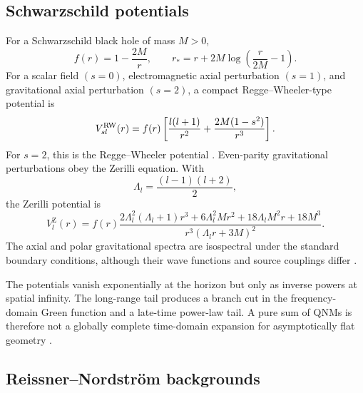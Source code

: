 \subsection{Schwarzschild potentials}
\label{subsec:schwarzschild-potentials}

For a Schwarzschild black hole of mass $M>0$,
\begin{equation}
  f(r)=1-\frac{2M}{r},
  \qquad
  r_*=r+2M\log\left(\frac{r}{2M}-1\right) .
  \label{eq:schwarzschild-tortoise}
\end{equation}
For a scalar field $(s=0)$, electromagnetic axial perturbation $(s=1)$, and
gravitational axial perturbation $(s=2)$, a compact Regge--Wheeler-type
potential is
\begin{equation}
  V_{sl}^{\mathrm{RW}}(r)
  =f(r)\left[
  \frac{l(l+1)}{r^2}
  +\frac{2M(1-s^2)}{r^3}
  \right] .
  \label{eq:regge-wheeler-family}
\end{equation}
For $s=2$, this is the Regge--Wheeler potential
\cite{Regge:1957td}.  Even-parity gravitational perturbations obey the Zerilli
equation.  With
\begin{equation}
  \Lambda_l=\frac{(l-1)(l+2)}{2},
  \label{eq:zerilli-lambda}
\end{equation}
the Zerilli potential is
\begin{equation}
  V_l^{\mathrm Z}(r)
  =f(r)
  \frac{
  2\Lambda_l^2(\Lambda_l+1)r^3
  +6\Lambda_l^2Mr^2
  +18\Lambda_lM^2r
  +18M^3}
  {r^3(\Lambda_lr+3M)^2} .
  \label{eq:zerilli-potential}
\end{equation}
The axial and polar gravitational spectra are isospectral under the standard
boundary conditions, although their wave functions and source couplings
differ
\cite{Zerilli:1970wzz,Chandrasekhar:book}.

The potentials vanish exponentially at the horizon but only as inverse powers
at spatial infinity.  The long-range tail produces a branch cut in the
frequency-domain Green function and a late-time power-law tail.  A pure sum of
QNMs is therefore not a globally complete time-domain expansion for
asymptotically flat geometry
\cite{Leaver:1986gd,Ching:1994bd,Casals:2013mpa}.

\subsection{Reissner--Nordstr\"om backgrounds}
\label{subsec:rn-potentials}

